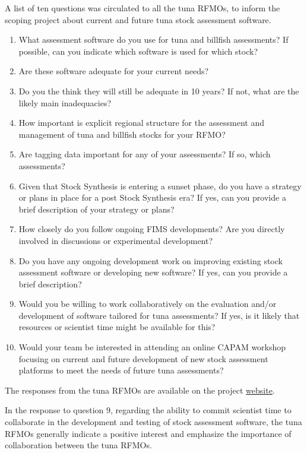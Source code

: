 \documentclass{SCreport}
\newcommand\tree
{https://github.com/PacificCommunity/ofp-sam-transition-plan/tree/main}
\begin{document}
\vspace{2ex}

A list of ten questions was circulated to all the tuna RFMOs, to inform the
scoping project about current and future tuna stock assessment software.

\begin{enumerate}
  \item What assessment software do you use for tuna and billfish assessments?
  If possible, can you indicate which software is used for which stock?
  \item Are these software adequate for your current needs?
  \item Do you the think they will still be adequate in 10 years? If not, what
  are the likely main inadequacies?
  \item How important is explicit regional structure for the assessment and
  management of tuna and billfish stocks for your RFMO?
  \item Are tagging data important for any of your assessments? If so, which
  assessments?
  \item Given that Stock Synthesis is entering a sunset phase, do you have a
  strategy or plans in place for a post Stock Synthesis era? If yes, can you
  provide a brief description of your strategy or plans?
  \item How closely do you follow ongoing FIMS developments? Are you directly
  involved in discussions or experimental development?
  \item Do you have any ongoing development work on improving existing stock
  assessment software or developing new software? If yes, can you provide a
  brief description?
  \item Would you be willing to work collaboratively on the evaluation and/or
  development of software tailored for tuna assessments? If yes, is it likely
  that resources or scientist time might be available for this?
  \item Would your team be interested in attending an online CAPAM workshop
  focusing on current and future development of new stock assessment platforms
  to meet the needs of future tuna assessments?
\end{enumerate}

\vspace{2ex}

The responses from the tuna RFMOs are available on the project
\href{\tree/notes/rfmo_discussion/feedback}{website}.

In the response to question 9, regarding the ability to commit scientist time to
collaborate in the development and testing of stock assessment software, the
tuna RFMOs generally indicate a positive interest and emphasize the importance
of collaboration between the tuna RFMOs.
\end{document}
